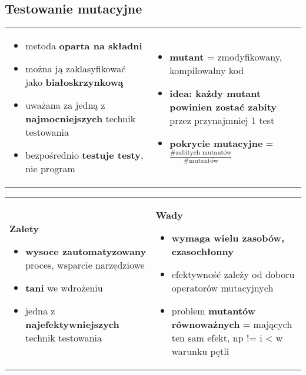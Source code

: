 \documentclass[../main.tex]{subfiles}
\begin{document}
    \subsection{Testowanie mutacyjne}
    \begin{table}[H]
        \begin{center}
            \begin{tabular}{p{8cm} p{8cm}}
                \begin{itemize}
                    \item metoda \textbf{oparta na składni}
                    \item można ją zaklasyfikować jako \textbf{białoskrzynkową}
                    \item uważana za jedną z \textbf{najmocniejszych} technik testowania
                    \item bezpośrednio \textbf{testuje testy}, nie program
                \end{itemize}
                &
                \begin{itemize}
                    \item \textbf{mutant} = zmodyfikowany, kompilowalny kod
                    \item \textbf{idea: każdy mutant powinien zostać zabity} przez
                    przynajmniej 1 test
                    \item \textbf{pokrycie mutacyjne} = $\frac{\# \text{zabitych mutantów}}{\# \text{mutantów}}$
                \end{itemize}
            \end{tabular}
        \end{center}
    \end{table}

    \begin{table}[H]
        \begin{center}
            \begin{tabular}{p{8cm} p{8cm}}
                \textbf{Zalety}
                \begin{itemize}
                    \item \textbf{wysoce zautomatyzowany} proces, wsparcie narzędziowe
                    \item \textbf{tani} we wdrożeniu
                    \item jedna z \textbf{najefektywniejszych} technik testowania
                \end{itemize}
                &
                \textbf{Wady}
                \begin{itemize}
                    \item \textbf{wymaga wielu zasobów, czasochłonny}
                    \item efektywność zależy od doboru operatorów mutacyjnych
                    \item problem \textbf{mutantów równoważnych} = mających ten sam efekt, np != i < w warunku pętli
                \end{itemize}
            \end{tabular}
        \end{center}
    \end{table}
\end{document}

